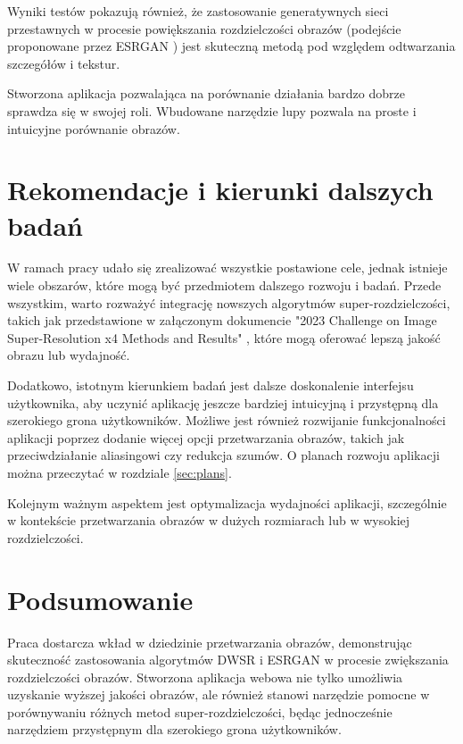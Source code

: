 Wyniki testów pokazują również, że zastosowanie generatywnych sieci przestawnych w procesie powiększania rozdzielczości obrazów (podejście proponowane przez ESRGAN \cite{wang2018esrgan}) jest skuteczną metodą pod względem odtwarzania szczegółów i tekstur. 


Stworzona aplikacja pozwalająca na porównanie działania bardzo dobrze sprawdza się w swojej roli. Wbudowane narzędzie lupy pozwala na proste i intuicyjne porównanie obrazów. 



\section{Rekomendacje i kierunki dalszych badań}

W ramach pracy udało się zrealizować wszystkie postawione cele, jednak istnieje wiele obszarów, które mogą być przedmiotem dalszego rozwoju i badań. Przede wszystkim, warto rozważyć integrację nowszych algorytmów super-rozdzielczości, takich jak przedstawione w załączonym dokumencie "2023 Challenge on Image Super-Resolution x4 Methods and Results" \cite{NTIRE2023}, które mogą oferować lepszą jakość obrazu lub wydajność.

Dodatkowo, istotnym kierunkiem badań jest dalsze doskonalenie interfejsu użytkownika, aby uczynić aplikację jeszcze bardziej intuicyjną i przystępną dla szerokiego grona użytkowników. Możliwe jest również rozwijanie funkcjonalności aplikacji poprzez dodanie więcej opcji przetwarzania obrazów, takich jak przeciwdziałanie aliasingowi czy redukcja szumów. O planach rozwoju aplikacji można przeczytać w rozdziale \ref{sec:plans}.

Kolejnym ważnym aspektem jest optymalizacja wydajności aplikacji, szczególnie w kontekście przetwarzania obrazów w dużych rozmiarach lub w wysokiej rozdzielczości. 

\section*{Podsumowanie}

Praca dostarcza wkład w dziedzinie przetwarzania obrazów, demonstrując skuteczność zastosowania algorytmów DWSR i ESRGAN w procesie zwiększania rozdzielczości obrazów. Stworzona aplikacja webowa nie tylko umożliwia uzyskanie wyższej jakości obrazów, ale również stanowi narzędzie pomocne w porównywaniu różnych metod super-rozdzielczości, będąc jednocześnie narzędziem przystępnym dla szerokiego grona użytkowników.